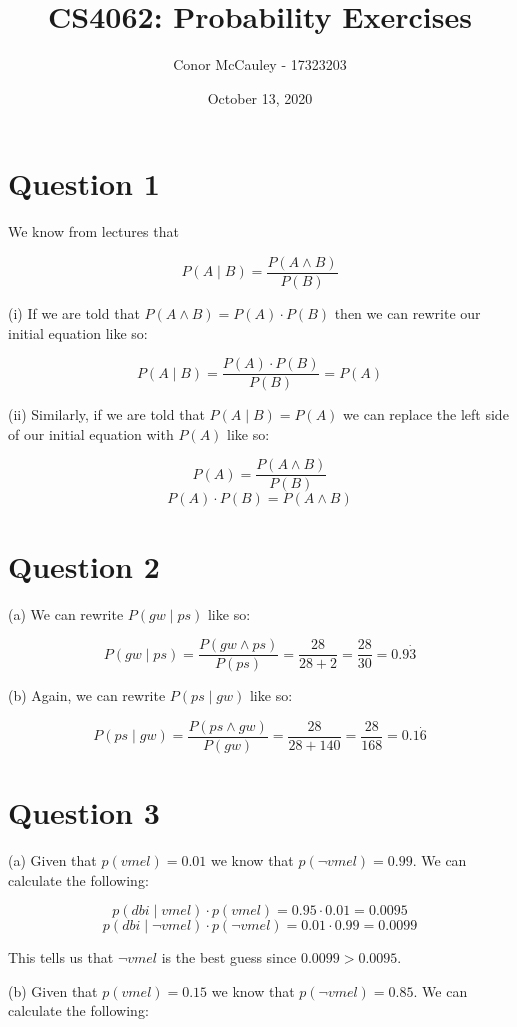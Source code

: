 \documentclass[12pt]{article}
\title{CS4062: Probability Exercises}
\author{Conor McCauley - 17323203}
\date{October 13, 2020}
\begin{document}
\maketitle

\section*{Question 1}

We know from lectures that

$$P(A \mid B) = \frac{P(A \wedge B)}{P(B)}$$

\noindent (i) If we are told that $P(A \wedge B) = P(A) \cdot P(B)$ then we can rewrite our initial equation like so:

$$P(A \mid B) = \frac{P(A) \cdot P(B)}{P(B)} = P(A)$$

\noindent (ii) Similarly, if we are told that $P(A \mid B) = P(A)$ we can replace the left side of our initial equation with $P(A)$ like so:

$$P(A) = \frac{P(A \wedge B)}{P(B)}$$
$$P(A) \cdot P(B) = P(A \wedge B)$$

\section*{Question 2}

\noindent (a) We can rewrite $P(gw \mid ps)$ like so:

$$P(gw \mid ps) = \frac{P(gw \wedge ps)}{P(ps)} = \frac{28}{28 + 2} = \frac{28}{30} = 0.9\dot{3}$$

\noindent (b) Again, we can rewrite $P(ps \mid gw)$ like so:

$$P(ps \mid gw) = \frac{P(ps \wedge gw)}{P(gw)} = \frac{28}{28 + 140} = \frac{28}{168} = 0.1\dot{6}$$

\section*{Question 3}

\noindent (a) Given that $p(vmel) = 0.01$ we know that $p(\neg vmel) = 0.99$. We can calculate the following:

$$p(dbi \mid vmel) \cdot p(vmel) = 0.95 \cdot 0.01 = 0.0095$$
$$p(dbi \mid \neg vmel) \cdot p(\neg vmel) = 0.01 \cdot 0.99 = 0.0099$$

This tells us that $\neg vmel$ is the best guess since $0.0099 > 0.0095$.

\noindent (b) Given that $p(vmel) = 0.15$ we know that $p(\neg vmel) = 0.85$. We can calculate the following:
\end{document}
